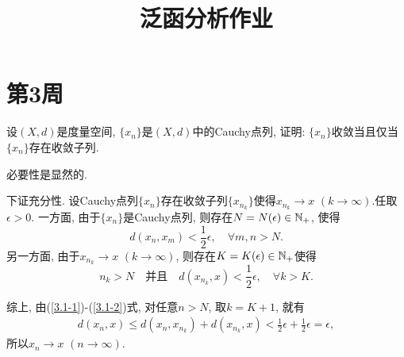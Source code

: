 \documentclass[UTF8,oneside,12pt]{article}  %
\makeatletter
\theoremstyle{DingLi1}
\numberwithin{equation}{section}
\theoremstyle{DingLi2}
\newtheorem{example}{\hskip 2em 问题}[section]
\renewenvironment{proof}[1][\proofname]{\par%
\pushQED{\qed}%
\normalfont \topsep6\p@\@plus6\p@\relax%
\trivlist%
\item[\hskip\labelsep%
#1]\ignorespaces%
}{%
\popQED\endtrivlist\@endpefalse%
}
\renewcommand{\proofname}{\heiti\large\color{blue} 证明}%
\makeatother
\begin{document}
\title{ 泛函分析作业}
\author{}
\date{}
\maketitle

\section{第3周}

\begin{example}
设$(X,d)$是度量空间, $\{x_n\}$是$(X,d)$中的Cauchy点列, 证明: $\{x_n\}$收敛当且仅当$\{x_n\}$存在收敛子列.
\end{example}

\begin{proof}
必要性是显然的.

下证充分性. 设Cauchy点列$\{x_n\}$存在收敛子列$\{x_{n_k}\}$使得$x_{n_k}\to x$ $(k\to \infty)$.任取$\epsilon>0$. 一方面, 由于$\{x_n\}$是Cauchy点列, 则存在$N=N(\epsilon)\in \Bbb{N}_+$, 使得
\begin{equation}\label{3.1-1}
d(x_n, x_m)<\frac12 \epsilon,\quad \forall m,n>N.
\end{equation}
另一方面, 由于$x_{n_k}\to x$ $(k\to \infty)$, 则存在$K=K(\epsilon)\in \Bbb{N}_+$使得
\begin{equation}\label{3.1-2}
n_k >N\quad\text{并且}\quad d(x_{n_k},x) <\frac12 \epsilon,\quad \forall k>K.
\end{equation}


综上, 由(\ref{3.1-1})-(\ref{3.1-2})式, 对任意$n>N$, 取$k=K+1$, 就有
\begin{eqnarray*}
d(x_n ,x)\leq d(x_n,x_{n_k})+d(x_{n_k}, x)<\frac12 \epsilon+\frac12 \epsilon=\epsilon,
\end{eqnarray*}
所以$x_n\to x$ $(n\to \infty)$.
\end{proof}
\end{document}
